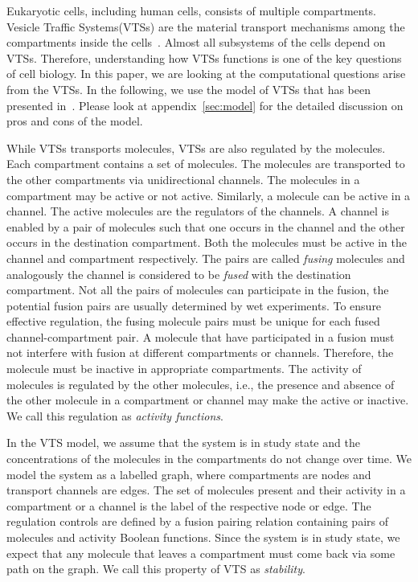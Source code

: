 Eukaryotic cells, including human cells, consists of multiple compartments.
%
Vesicle Traffic Systems(VTSs) are the material transport mechanisms
among the compartments inside the cells~\cite{vtsIntro}.
%
Almost all subsystems of the cells depend on VTSs.
%
Therefore, understanding how VTSs functions is one of the key
questions of cell biology.
%
In this paper, we are looking at the computational questions 
arise from the VTSs.
%
In the following, we use the model of VTSs that has been presented
in~\cite{VTS}.
%
Please look at appendix~\ref{sec:model}
for the detailed discussion on pros and cons of the model.

While VTSs transports molecules, VTSs are also
regulated by the molecules.
%
Each compartment contains a set of molecules.
%
The molecules are transported to the other compartments via
unidirectional channels.  
%
The molecules in a compartment may be active or not active.
%
Similarly, a molecule can be active in a channel. 
%
The active molecules are the regulators of the channels.
%
A channel is enabled by a pair of molecules
such that one occurs in the channel and the other
occurs in the destination compartment.
%
Both the molecules must be active in the channel
and compartment respectively.
%
The pairs are called {\em fusing} molecules and analogously
the channel is considered to be {\em fused} with the
destination compartment.
%
Not all the pairs of molecules can participate in the fusion, the
potential fusion pairs are usually determined by wet experiments.
%
To ensure effective regulation, the fusing molecule pairs must be
unique for each fused channel-compartment pair.
%
A molecule that have participated in a fusion must not interfere
with fusion at different compartments or channels.
%
Therefore, the molecule must be inactive in appropriate compartments.
%
The activity of molecules is regulated by the other molecules, i.e.,
the presence and absence of the other molecule in a compartment or
channel may make the active or inactive.
%
We call this regulation as {\em activity functions}.

%
In the VTS model, we assume that the system is in study state and
the concentrations of the molecules in the compartments do not change over time.
%
We model the system as a labelled graph, where compartments are nodes and
transport channels are edges.
%
The set of molecules present and their activity in a compartment or
a channel is the label of the respective node or edge.
%
The regulation controls are defined by a fusion pairing relation
containing pairs of molecules and activity
Boolean functions.
%
Since the system is in study state, we expect that any molecule that
leaves a compartment must come back via some path on the graph.
%
We call this property of VTS as {\em stability}.

